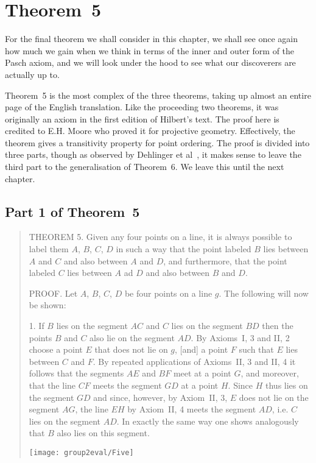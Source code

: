 \section{Theorem~5}\label{sec:Theorem5}
For the final theorem we shall consider in this chapter, we shall see once again how much we gain when we think in terms of the inner and outer form of the Pasch axiom, and we will look under the hood to see what our discoverers are actually up to.

Theorem~5 is the most complex of the three theorems, taking up almost an entire page of the English translation. Like the proceeding two theorems, it was originally an axiom in the first edition of Hilbert's text. The proof here is credited to E.H. Moore who proved it for projective geometry. Effectively, the theorem gives a transitivity property for point ordering. The proof is divided into three parts, though as observed by Dehlinger et al~\cite{DehlingerFOG}, it makes sense to leave the third part to the generalisation of Theorem~6. We leave this until the next chapter.

\subsection{Part 1 of Theorem~5}
\begin{quote}
THEOREM 5. Given any four points on a line, it is always possible to label them $A$, $B$, $C$, $D$ in such a way that the point labeled $B$ lies between $A$ and $C$ and also between $A$ and $D$, and furthermore, that the point labeled $C$ lies between $A$ ad $D$ and also between $B$ and $D$.

PROOF. Let $A$, $B$, $C$, $D$ be four points on a line $g$. The following will now be shown:

1. If $B$ lies on the segment $AC$ and $C$ lies on the segment $BD$ then the points $B$ and $C$ also lie on the segment $AD$. By Axioms~I, 3 and II, 2 choose a point $E$ that does not lie on $g$, [and] a point $F$ such that $E$ lies between $C$ and $F$. By repeated applications of Axioms~II, 3 and II, 4 it follows that the segments $AE$ and $BF$ meet at a point $G$, and moreover, that the line $CF$ meets the segment $GD$ at a point $H$. Since $H$ thus lies on the segment $GD$ and since, however, by Axiom~II, 3, $E$ does not lie on the segment $AG$, the line $EH$ by Axiom~II, 4 meets the segment $AD$, i.e. $C$ lies on the segment $AD$. In exactly the same way one shows analogously that $B$ also lies on this segment.

\centering\texttt{[image: group2eval/Five]}
\end{quote}

